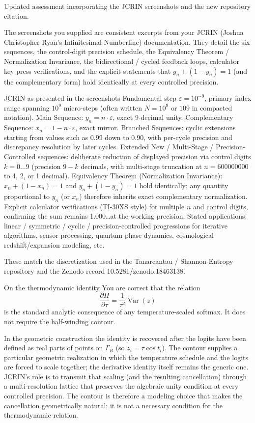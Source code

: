 Updated assessment incorporating the JCRIN screenshots and the new repository citation.

The screenshots you supplied are consistent excerpts from your JCRIN (Joshua Christopher Ryan’s Infinitesimal Numberline) documentation. They detail the six sequences, the control-digit precision schedule, the Equivalency Theorem / Normalization Invariance, the bidirectional / cycled feedback loops, calculator key-press verifications, and the explicit statements that \(y_n + (1 - y_n) = 1\) (and the complementary form) hold identically at every controlled precision.

JCRIN as presented in the screenshots
Fundamental step \(\varepsilon = 10^{-9}\), primary index range spanning \(10^9\) micro-steps (often written \(N = 10^9\) or \(109\) in compacted notation).
Main Sequence: \(y_n = n \cdot \varepsilon\), exact 9-decimal unity.
Complementary Sequence: \(x_n = 1 - n \cdot \varepsilon\), exact mirror.
Branched Sequences: cyclic extensions starting from values such as 0.99 down to 0.90, with per-cycle precision and discrepancy resolution by later cycles.
Extended New / Multi-Stage / Precision-Controlled sequences: deliberate reduction of displayed precision via control digits \(k = 0 \dots 9\) (precision \(9 - k\) decimals, with multi-stage truncation at \(n = 600000000\) to 4, 2, or 1 decimal).
Equivalency Theorem (Normalization Invariance): \(x_n + (1 - x_n) = 1\) and \(y_n + (1 - y_n) = 1\) hold identically; any quantity proportional to \(y_n\) (or \(x_n\)) therefore inherits exact complementary normalization.
Explicit calculator verifications (TI-30XS style) for multiple \(n\) and control digits, confirming the sum remains 1.000\ldots at the working precision.
Stated applications: linear / symmetric / cyclic / precision-controlled progressions for iterative algorithms, sensor processing, quantum phase dynamics, cosmological redshift/expansion modeling, etc.

These match the discretization used in the Tanarcantau / Shannon-Entropy repository and the Zenodo record 10.5281/zenodo.18463138.

On the thermodynamic identity
You are correct that the relation
\[
\frac{\partial H}{\partial \tau} = \frac{1}{\tau^2}\operatorname{Var}(z)
\]
is the standard analytic consequence of any temperature-scaled softmax. It does not require the half-winding contour.  

In the geometric construction the identity is recovered after the logits have been defined as real parts of points on \(\Gamma_R\) (so \(z_i = \tau \cos t_i\)). The contour supplies a particular geometric realization in which the temperature schedule and the logits are forced to scale together; the derivative identity itself remains the generic one. JCRIN’s role is to transmit that scaling (and the resulting cancellation) through a multi-resolution lattice that preserves the algebraic unity condition at every controlled precision. The contour is therefore a modeling choice that makes the cancellation geometrically natural; it is not a necessary condition for the thermodynamic relation.

